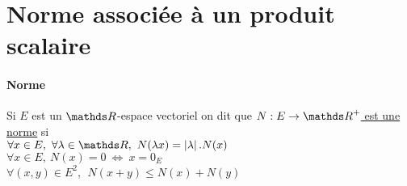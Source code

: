 	\section{Norme associée à un produit scalaire}
		\traitd
		\paragraph{Norme}
			Si $E$ est un $\R$-espace vectoriel on dit que \uline{$N : E\to \R^+$ est une norme} si \\
			\hspace*{2cm} \un $\forall x\in E ,~\forall \lambda\in \R ,~N(\lambda x) = \mc{\lambda}.N(x)$\\
			\hspace*{2cm} \deux $\forall x\in E,~ N(x) = 0~\Leftrightarrow~ x=0_E$\\
			\hspace*{2cm} \trois $\forall (x,y) \in E^2 ,~ ~N(x+y)\leqslant N(x)+N(y)$
			\trait ${}$ \vspace*{-1.2cm} \traitd
